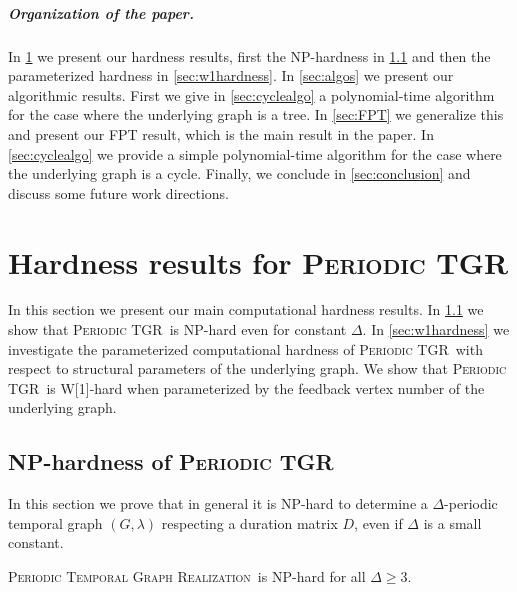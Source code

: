 \documentclass[a4paper,UKenglish,cleveref, autoref, thm-restate, anonymous]{lipics-v2021}
\newcommand{\NP}{\textrm{NP}}
\newcommand{\deltaExactLong}{\textsc{Periodic Temporal Graph Realization}}
\newcommand{\deltaExact}{\textsc{Periodic TGR}}
\begin{document}
\subparagraph{Organization of the paper.}
In \cref{sec:hardness} we present our hardness results, first the NP-hardness in \cref{sec:nphardness} and then the parameterized hardness in \cref{sec:w1hardness}. In \cref{sec:algos} we present our algorithmic results. First we give in \cref{sec:cyclealgo} a polynomial-time algorithm for the case where the underlying graph is a tree. In \cref{sec:FPT} we generalize this and present our FPT result, which is the main result in the paper. In \cref{sec:cyclealgo} we provide a simple polynomial-time algorithm for the case where the underlying graph is a cycle. Finally, we conclude in \cref{sec:conclusion} and discuss some future work directions.

\section{Hardness results for \deltaExact}\label{sec:hardness}
In this section we present our main computational hardness results. In \cref{sec:nphardness} we show that \deltaExact\ is NP-hard even for constant $\Delta$. In \cref{sec:w1hardness} we investigate the parameterized computational hardness of \deltaExact\ with respect to structural parameters of the underlying graph. We show that \deltaExact\ is W[1]-hard when parameterized by the feedback vertex number of the underlying graph.

\subsection{NP-hardness of \deltaExact}\label{sec:nphardness}
In this section we prove that in general it is NP-hard to determine a $\Delta$-periodic temporal graph $(G,\lambda)$ respecting a duration matrix $D$,
even if $\Delta$ is a small constant.

\begin{theorem}\label{thm:NPhardness}
	\deltaExactLong\ is \NP-hard for all $\Delta \geq 3$.
\end{theorem}
\end{document}

